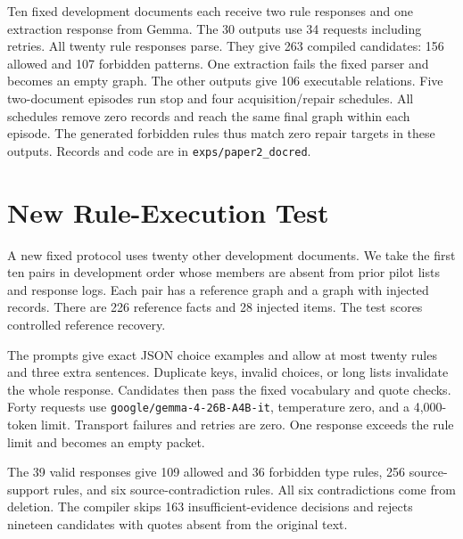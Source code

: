 Ten fixed development documents each receive two rule responses and one
extraction response from Gemma. The 30 outputs use 34 requests including
retries. All twenty rule responses parse. They give 263 compiled candidates:
156 allowed and 107 forbidden patterns. One extraction fails the fixed
parser and becomes an empty graph. The other outputs give 106 executable
relations. Five two-document episodes run stop and four acquisition/repair
schedules. All schedules remove zero records and reach the same final
graph within each episode. The generated forbidden rules thus match zero
repair targets in these outputs. Records and code are in
\texttt{exps/paper2\_docred}.





\section{New Rule-Execution Test}

\label{app:new_rule_feasibility}

A new fixed protocol uses twenty other development documents.
We take the first ten pairs in development order whose members are absent
from prior pilot lists and response logs. Each pair has a reference graph
and a graph with injected records. There are 226 reference facts and
28 injected items. The test scores controlled reference recovery.

The prompts give exact JSON choice examples and allow at most twenty
rules and three extra sentences. Duplicate keys, invalid choices, or long
lists invalidate the whole response. Candidates then pass the fixed
vocabulary and quote checks. Forty requests use
\texttt{google/gemma-4-26B-A4B-it}, temperature zero, and a 4,000-token
limit. Transport failures and retries are zero. One response exceeds
the rule limit and becomes an empty packet.

The 39 valid responses give 109 allowed and 36 forbidden type rules,
256 source-support rules, and six source-contradiction rules.
All six contradictions come from deletion. The compiler skips 163
insufficient-evidence decisions and rejects nineteen candidates with
quotes absent from the original text.

